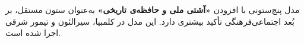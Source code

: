 




\begin{notebox}[title={\rl{مدل جامع (\lr{Holistic Model}) --- با ستون مستقل آشتی ملی}}]
مدل پنج‌ستونی با افزودن \textbf{«آشتی ملی و حافظه‌ی تاریخی»} به‌عنوان ستون مستقل، بر بُعد اجتماعی‌فرهنگی تأکید بیشتری دارد. این مدل در کلمبیا، سیرالئون و تیمور شرقی اجرا شده است.
\end{notebox}

